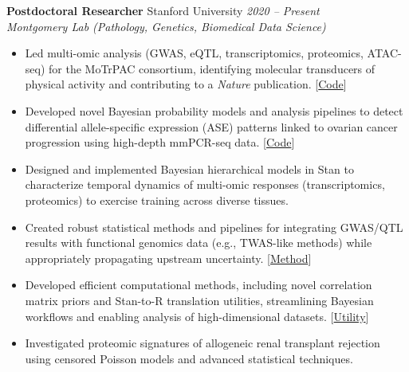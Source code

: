 \documentclass[11pt,margin,line]{resume}
\begin{document}
\begin{resume}
\textbf{Postdoctoral Researcher} \hfill Stanford University \hfill \emph{2020 -- Present} \\
\textit{Montgomery Lab (Pathology, Genetics, Biomedical Data Science)}
\vspace{-1mm}
\begin{itemize} \itemsep -0.5em %
    \item Led multi-omic analysis (GWAS, eQTL, transcriptomics, proteomics, ATAC-seq) for the MoTrPAC consortium, identifying molecular transducers of physical activity and contributing to a \textit{Nature} publication. [\href{https://github.com/NikVetr/MoTrPAC_Complex_Traits}{Code}]
    \item Developed novel Bayesian probability models and analysis pipelines to detect differential allele-specific expression (ASE) patterns linked to ovarian cancer progression using high-depth mmPCR-seq data. [\href{https://github.com/nsabell/egtex-ase}{Code}]
    \item Designed and implemented Bayesian hierarchical models in Stan to characterize temporal dynamics of multi-omic responses (transcriptomics, proteomics) to exercise training across diverse tissues.
    \item Created robust statistical methods and pipelines for integrating GWAS/QTL results with functional genomics data (e.g., TWAS-like methods) while appropriately propagating upstream uncertainty. [\href{https://github.com/NikVetr/papers/blob/main/twas-method/proposed_TWAS_method.pdf}{Method}]
    \item Developed efficient computational methods, including novel correlation matrix priors and Stan-to-R translation utilities, streamlining Bayesian workflows and enabling analysis of high-dimensional datasets. [\href{https://github.com/NikVetr/montgomery_lab/blob/master/parse_Stan.R}{Utility}]
    \item Investigated proteomic signatures of allogeneic renal transplant rejection using censored Poisson models and advanced statistical techniques.
\end{itemize}
\vspace{-2mm}


\end{resume}
\end{document}
